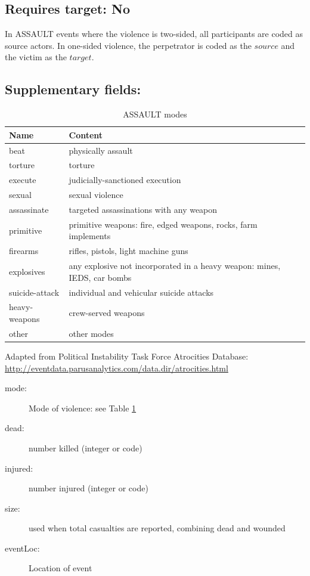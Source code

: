 \documentclass[11pt]{report}
\newcommand{\plcat}[1]{\textsf{#1}}
\begin{document}
\subsection{Requires target: No}

\plcat In {ASSAULT} events where the violence is two-sided, all participants are coded as source actors. In one-sided violence, the perpetrator is coded as the $source$ and the victim as the $target$.

\subsection{Supplementary fields:}


\begin{table}[htp]
\caption{ASSAULT modes}
\begin{center}
\begin{tabular}{|l|l|}
\hline
Name & Content \\
\hline
beat & physically assault \\
torture & torture \\
execute & judicially-sanctioned execution\\
sexual & sexual violence\\
assassinate & targeted assassinations with any weapon \\
primitive & primitive weapons: fire, edged weapons, rocks, farm implements \\
firearms & rifles, pistols, light machine guns\\
explosives & any explosive not incorporated in a heavy weapon: mines, IEDS, car bombs \\
suicide-attack & individual and vehicular suicide attacks \\
heavy-weapons & crew-served weapons  \\
other & other modes \\
\hline
\end{tabular}
\end{center}
\label{tab:violmode}
\raggedright{Adapted from Political Instability Task Force Atrocities Database: \url{http://eventdata.parusanalytics.com/data.dir/atrocities.html}}
\end{table}%

\begin{description}
    \item[mode:] Mode of violence: see Table \ref{tab:violmode} 
    \item[dead:]  number killed (integer or code) 
    \item[injured:] number injured (integer or code) 
    \item[size:] used when total casualties are reported, combining dead and wounded 
    \item[eventLoc:] Location of event 
\end{description}
\end{document}
